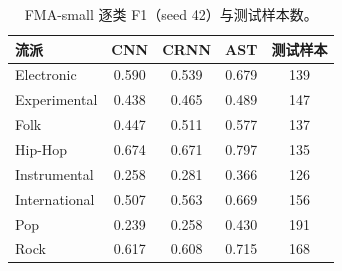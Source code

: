 \begin{table}[H]
\centering\small
\caption{FMA-small 逐类 F1（seed 42）与测试样本数。}
\label{tab:fma-perclass}
\begin{tabular}{lcccc}
\toprule
流派 & CNN & CRNN & AST & 测试样本\\
\midrule
Electronic & 0.590 & 0.539 & 0.679 & 139\\
Experimental & 0.438 & 0.465 & 0.489 & 147\\
Folk & 0.447 & 0.511 & 0.577 & 137\\
Hip-Hop & 0.674 & 0.671 & 0.797 & 135\\
Instrumental & 0.258 & 0.281 & 0.366 & 126\\
International & 0.507 & 0.563 & 0.669 & 156\\
Pop & 0.239 & 0.258 & 0.430 & 191\\
Rock & 0.617 & 0.608 & 0.715 & 168\\
\bottomrule
\end{tabular}
\end{table}
